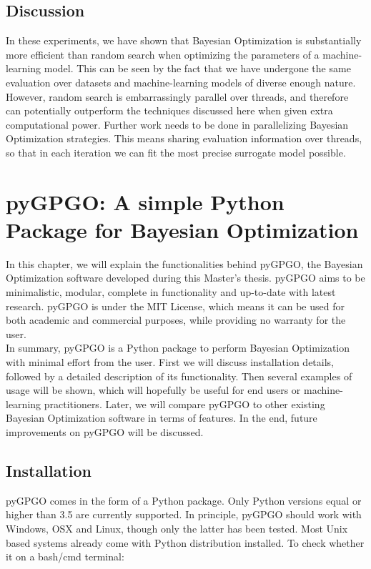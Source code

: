 \documentclass[10pt,a4paper,twoside]{book}
\begin{document}
\section{Discussion}
In these experiments, we have shown that Bayesian Optimization is substantially more efficient than random search when optimizing the parameters of a machine-learning model. This can be seen by the fact that we have undergone the same evaluation over datasets and machine-learning models of diverse enough nature. However, random search is embarrassingly parallel over threads, and therefore can potentially outperform the techniques discussed here when given extra computational power. Further work needs to be done in parallelizing Bayesian Optimization strategies. This means sharing evaluation information over threads, so that in each iteration we can fit the most precise surrogate model possible.

\printbibliography

\chapter{pyGPGO: A simple Python Package for Bayesian Optimization}

In this chapter, we will explain the functionalities behind pyGPGO, the Bayesian Optimization software developed during this Master's thesis. pyGPGO aims to be minimalistic, modular, complete in functionality and up-to-date with latest research. pyGPGO is under the MIT License, which means it can be used for both academic and commercial purposes, while providing no warranty for the user.\\

In summary, pyGPGO is a Python package to perform Bayesian Optimization with minimal effort from the user. First we will discuss installation details, followed by a detailed description of its functionality. Then several examples of usage will be shown, which will hopefully be useful for end users or machine-learning practitioners. Later, we will compare pyGPGO to other existing Bayesian Optimization software in terms of features. In the end, future improvements on pyGPGO will be discussed.

\section{Installation}

pyGPGO comes in the form of a Python package. Only Python versions equal or higher than 3.5 are currently supported. In principle, pyGPGO should work with Windows, OSX and Linux, though only the latter has been tested. Most Unix based systems already come with Python distribution installed. To check whether it on a bash/cmd terminal:
\end{document}
